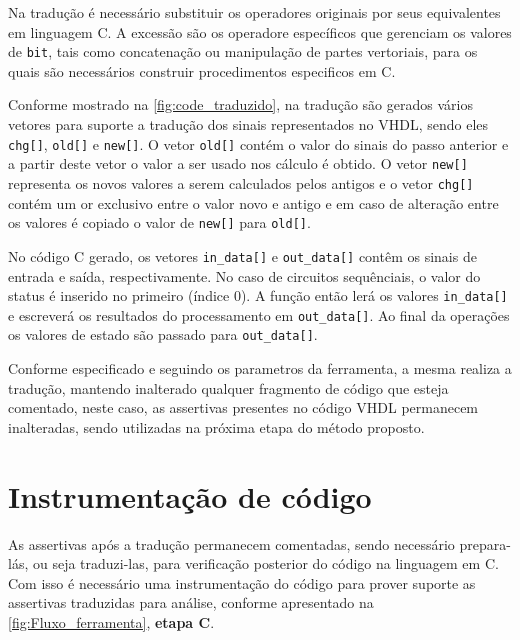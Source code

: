 \par
Na tradução é necessário substituir os operadores originais por seus equivalentes em linguagem C. A excessão são os operadore específicos que gerenciam os valores de \texttt{bit}, tais como concatenação ou manipulação de partes vertoriais, para os quais são necessários construir procedimentos especificos em C.

Conforme mostrado na \autoref{fig:code_traduzido}, na tradução são gerados vários vetores para suporte a tradução dos sinais representados no VHDL, sendo eles \texttt{chg[]}, \texttt{old[]} e \texttt{new[]}. O vetor \texttt{old[]} contém o valor do sinais do passo anterior e a partir deste vetor o valor a ser usado nos cálculo é obtido. O vetor \texttt{new[]} representa os novos valores a serem calculados pelos antigos e o vetor \texttt{chg[]} contém um or exclusivo entre o valor novo e antigo e em caso de alteração entre os valores é copiado o valor de \texttt{new[]} para \texttt{old[]}.


\par
No código C gerado, os vetores \texttt{in\_data[]} e \texttt{out\_data[]} contêm os sinais de entrada e saída, respectivamente. No caso de circuitos sequênciais, o valor do status é inserido no primeiro (índice 0). A função então lerá os valores \texttt{in\_data[]} e escreverá os resultados do processamento em \texttt{out\_data[]}. Ao final da operações os valores de estado são passado para \texttt{out\_data[]}.


\par
Conforme especificado e seguindo os parametros da ferramenta, a mesma realiza a tradução, mantendo inalterado qualquer fragmento de código que esteja comentado, neste caso, as assertivas presentes no código VHDL permanecem inalteradas, sendo utilizadas na próxima etapa do método proposto.

\section{Instrumentação de código}

\par
As assertivas após a tradução permanecem comentadas, sendo necessário prepara-lás, ou seja traduzi-las, para verificação posterior do código na linguagem em C. Com isso é necessário uma instrumentação do código para prover suporte as assertivas traduzidas para análise, conforme apresentado na \autoref{fig:Fluxo_ferramenta}, \textbf{etapa C}.

